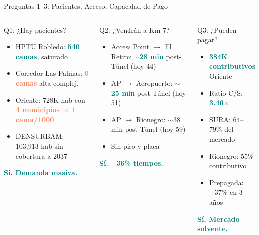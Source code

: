 \documentclass[aspectratio=169, 11pt]{beamer}
\newcommand{\highlight}[1]{\textcolor{teal}{\textbf{#1}}}
\newcommand{\danger}[1]{\textcolor{coral}{\textbf{#1}}}
\newcommand{\src}[1]{\par\vspace{2pt}{\tiny\textcolor{slate}{Fuente: #1}}}
\begin{document}
\begin{frame}{Preguntas 1--3: Pacientes, Acceso, Capacidad de Pago}

\begin{columns}[T]
\begin{block}{\small Q1: ¿Hay pacientes?}
\scriptsize
\begin{itemize}\setlength{\itemsep}{1pt}
  \item HPTU Robledo: \highlight{540 camas}, saturado
  \item Corredor Las Palmas: \danger{0 camas} alta complej.
  \item Oriente: 728K hab con \danger{4 municipios $<$1 cama/1000}
  \item DENSURBAM: 103,913 hab sin cobertura a 2037
\end{itemize}
\vspace{3pt}
\centering\highlight{Sí. Demanda masiva.}
\end{block}

\begin{block}{\small Q2: ¿Vendrán a Km 7?}
\scriptsize
\begin{itemize}\setlength{\itemsep}{1pt}
  \item Access Point $\to$ El Retiro: \highlight{$\sim$28 min} post-Túnel (hoy 44)
  \item AP $\to$ Aeropuerto: \highlight{$\sim$25 min} post-Túnel (hoy 51)
  \item AP $\to$ Rionegro: $\sim$38 min post-Túnel (hoy 59)
  \item Sin pico y placa
\end{itemize}
\vspace{3pt}
\centering\highlight{Sí. $-$36\% tiempos.}
\end{block}

\begin{block}{\small Q3: ¿Pueden pagar?}
\scriptsize
\begin{itemize}\setlength{\itemsep}{1pt}
  \item \highlight{384K contributivos} Oriente
  \item Ratio C/S: \highlight{3.46$\times$}
  \item SURA: 64--79\% del mercado
  \item Rionegro: 55\% contributivo
  \item Prepagada: +37\% en 3 años
\end{itemize}
\vspace{3pt}
\centering\highlight{Sí. Mercado solvente.}
\end{block}
\end{columns}

\src{REPS, DENSURBAM, Mapbox Matrix, BDUA, RUAF, SURA}
\end{frame}
\end{document}
